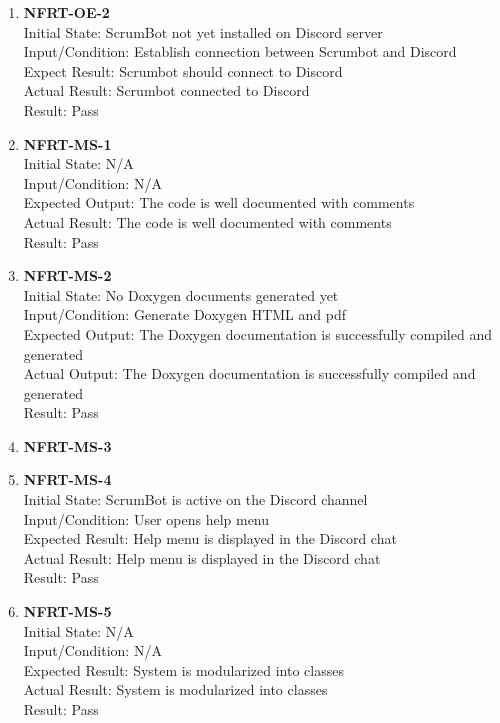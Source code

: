 \documentclass[12pt, titlepage]{article}
\begin{document}
\begin{enumerate}
    \item{\textbf{NFRT-OE-2}}\\
    Initial State: ScrumBot not yet installed on Discord server\\
    Input/Condition: Establish connection between Scrumbot and Discord\\
    Expect Result: Scrumbot should connect to Discord\\
    Actual Result: Scrumbot connected to Discord\\
    Result: Pass

    \item{\textbf{NFRT-MS-1}}\\
    Initial State: N/A\\
    Input/Condition: N/A\\
    Expected Output: The code is well documented with comments\\
    Actual Result: The code is well documented with comments\\
    Result: Pass
    
    \item{\textbf{NFRT-MS-2}}\\
    Initial State: No Doxygen documents generated yet\\
    Input/Condition: Generate Doxygen HTML and pdf\\
    Expected Output: The Doxygen documentation is successfully compiled and generated\\
    Actual Output: The Doxygen documentation is successfully compiled and generated\\
    Result: Pass

    \item{\textbf{NFRT-MS-3}}\\

    \item{\textbf{NFRT-MS-4}}\\
    Initial State: ScrumBot is active on the Discord channel\\
    Input/Condition: User opens help menu\\
    Expected Result: Help menu is displayed in the Discord chat\\
    Actual Result: Help menu is displayed in the Discord chat\\
    Result: Pass
    
    \item{\textbf{NFRT-MS-5}}\\
    Initial State: N/A\\
    Input/Condition: N/A\\
    Expected Result: System is modularized into classes\\
    Actual Result: System is modularized into classes\\
    Result: Pass
    

\end{enumerate}
\end{document}
